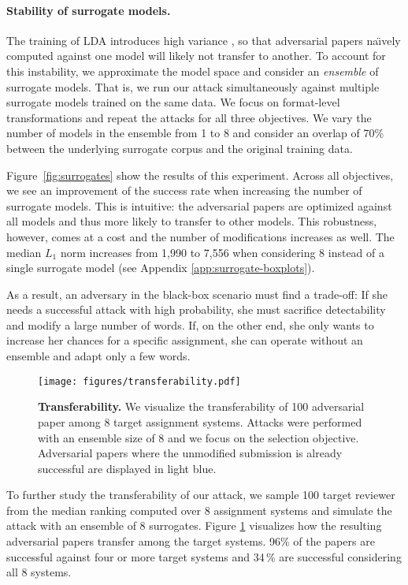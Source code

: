 \documentclass[letterpaper,twocolumn,10pt]{article}
\begin{document}
\paragraph{Stability of surrogate models.}
The training of LDA introduces high variance \cite{agrawal-18-what, mantyla-18-measuring}, so that adversarial papers na\"\i vely computed against one model will likely not transfer to another. To account for this instability, we approximate the model space and consider an \emph{ensemble} of surrogate models.
That is, we run our attack simultaneously against multiple surrogate models trained on the same data. We focus on format-level transformations and repeat the attacks for all three objectives. We vary the number of models in the ensemble from 1 to 8 and consider an overlap of 70\% between the underlying surrogate corpus and the original training data.

Figure~\ref{fig:surrogates} show the results of this experiment. Across all objectives, we see an improvement of the success rate when increasing the number of surrogate models. This is intuitive: the adversarial papers are optimized against all models and thus more likely to transfer to other models.
This robustness, however, comes at a cost and the number of modifications increases as well. The median $L_1$ norm increases from 1,990 to 7,556 when considering 8 instead of a single surrogate model (see Appendix \ref{app:surrogate-boxplots}). 

As a result, an adversary in the black-box scenario must find a trade-off: If she needs a successful attack with high probability, she must sacrifice detectability and modify a large number of words. If, on the other end, she only wants to increase her chances for a specific assignment, she can operate without an ensemble and adapt only a few words.

\begin{figure}[t]
    \centering
  	\texttt{[image: figures/transferability.pdf]}
    \caption{\textbf{Transferability.} We visualize the transferability of 100 adversarial paper among 8 target assignment systems. Attacks were performed with an ensemble size of 8 and we focus on the selection objective. Adversarial papers where the unmodified submission is already successful are displayed in light blue.}
    \label{fig:transferability}
      	\vspace{-1em}
\end{figure} 
To further study the transferability of our attack, we sample 100 target reviewer from the median ranking computed over 8 assignment systems and simulate the attack with an ensemble of 8 surrogates. Figure \ref{fig:transferability} visualizes how the resulting adversarial papers transfer among the target systems.
96\% of the papers are successful against four or more target systems and 34\,\% are successful considering all 8 systems.
\end{document}
